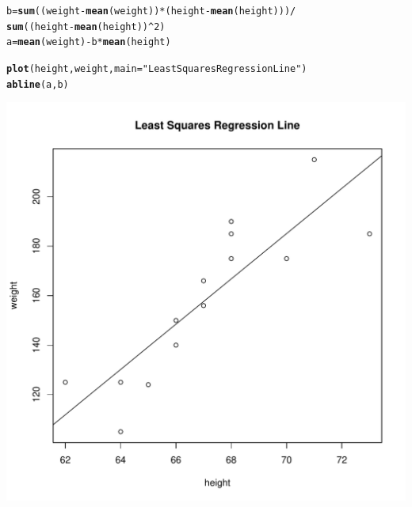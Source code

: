 \documentclass[11pt]{article}\usepackage[]{graphicx}\usepackage[]{color}
\makeatletter
\def\maxwidth{ %
  \ifdim\Gin@nat@width>\linewidth
    \linewidth
  \else
    \Gin@nat@width
  \fi
}
\newcommand{\hlnum}[1]{\textcolor[rgb]{0.686,0.059,0.569}{#1}}%
\newcommand{\hlstr}[1]{\textcolor[rgb]{0.192,0.494,0.8}{#1}}%
\newcommand{\hlopt}[1]{\textcolor[rgb]{0,0,0}{#1}}%
\newcommand{\hlstd}[1]{\textcolor[rgb]{0.345,0.345,0.345}{#1}}%
\newcommand{\hlkwb}[1]{\textcolor[rgb]{0.69,0.353,0.396}{#1}}%
\newcommand{\hlkwc}[1]{\textcolor[rgb]{0.333,0.667,0.333}{#1}}%
\newcommand{\hlkwd}[1]{\textcolor[rgb]{0.737,0.353,0.396}{\textbf{#1}}}%
\newenvironment{kframe}{%
 \def\at@end@of@kframe{}%
 \ifinner\ifhmode%
  \def\at@end@of@kframe{\end{minipage}}%
  \begin{minipage}{\columnwidth}%
 \fi\fi%
 \def\FrameCommand##1{\hskip\@totalleftmargin \hskip-\fboxsep
 \colorbox{shadecolor}{##1}\hskip-\fboxsep
     \hskip-\linewidth \hskip-\@totalleftmargin \hskip\columnwidth}%
 \MakeFramed {\advance\hsize-\width
   \@totalleftmargin\z@ \linewidth\hsize
   \@setminipage}}%
 {\par\unskip\endMakeFramed%
 \at@end@of@kframe}
\newenvironment{knitrout}{}{} %
\makeatother
\begin{document}
\begin{knitrout}
\color{fgcolor}\begin{kframe}
\begin{alltt}
\hlstd{b} \hlkwb{=} \hlkwd{sum}\hlstd{((weight}\hlopt{-}\hlkwd{mean}\hlstd{(weight))}\hlopt{*}\hlstd{(height}\hlopt{-}\hlkwd{mean}\hlstd{(height)))}\hlopt{/}
  \hlkwd{sum}\hlstd{((height}\hlopt{-}\hlkwd{mean}\hlstd{(height))}\hlopt{^}\hlnum{2}\hlstd{)}
\hlstd{a} \hlkwb{=} \hlkwd{mean}\hlstd{(weight)} \hlopt{-} \hlstd{b}\hlopt{*}\hlkwd{mean}\hlstd{(height)}

\hlkwd{plot}\hlstd{(height,weight,} \hlkwc{main} \hlstd{=} \hlstr{"Least Squares Regression Line"}\hlstd{)}
\hlkwd{abline}\hlstd{(a,b)}
\end{alltt}
\end{kframe}
\includegraphics[width=\maxwidth]{figure/unnamed-chunk-2-1} 

\end{knitrout}
\end{document}
